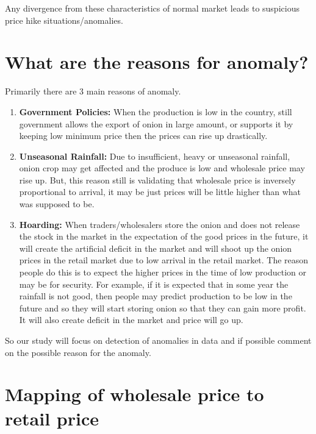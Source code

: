 Any divergence from these characteristics of normal market leads to suspicious price hike situations/anomalies.


\section{What are the reasons for anomaly?}

Primarily there are 3 main reasons of anomaly.

\begin{enumerate}

\item \textbf{Government Policies:} When the production is low in the country, still government allows the export of onion in large amount, or supports it by keeping low minimum price then the prices can rise up drastically.

\item \textbf{Unseasonal Rainfall:} Due to insufficient, heavy or unseasonal rainfall, onion crop may get affected and the produce is low and wholesale price may rise up. But, this reason still is validating that wholesale price is inversely proportional to arrival, it may be just prices will be little higher than what was supposed to be.

\item \textbf{Hoarding:} When traders/wholesalers store the onion and does not release the stock in the market in the expectation of the good prices in the future, it will create the artificial deficit in the market and will shoot up the onion prices in the retail market due to low arrival in the retail market. The reason people do this is to expect the higher prices in the time of low production or may be for security. For example, if it is expected that in some year the rainfall is not good, then people may predict  production to be low in the future and so they will start storing onion so that they can gain more profit. It will also create deficit in the market and price will go up.

\end{enumerate}

So our study will focus on detection of anomalies in data and if possible comment on the possible reason for the anomaly.

\section{Mapping of wholesale price to retail price}

